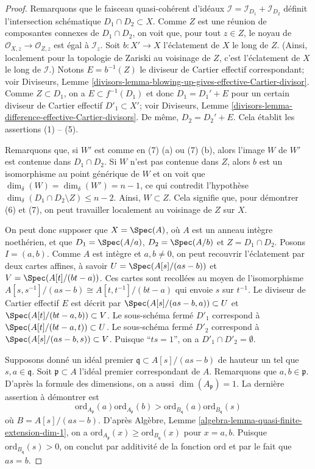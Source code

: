 \begin{proof}
Remarquons que le faisceau quasi-cohérent d'idéaux
$\mathcal{I} = \mathcal{I}_{D_1} + \mathcal{I}_{D_2}$
définit l'intersection schématique $D_1 \cap D_2 \subset X$.
Comme $Z$ est une réunion de composantes connexes de $D_1 \cap D_2$,
on voit que, pour tout $z \in Z$, le noyau de
$\mathcal{O}_{X, z} \to \mathcal{O}_{Z, z}$ est égal à $\mathcal{I}_z$.
Soit $b : X' \to X$ l'éclatement de $X$ le long de $Z$. (Ainsi, localement pour la topologie de Zariski
au voisinage de $Z$, c'est l'éclatement de $X$ le long de $\mathcal{I}$.)
Notons $E = b^{-1}(Z)$ le diviseur de Cartier effectif correspondant; voir
Diviseurs,
Lemme \ref{divisors-lemma-blowing-up-gives-effective-Cartier-divisor}.
Comme $Z \subset D_1$, on a $E \subset f^{-1}(D_1)$ et donc
$D_1 = D_1' + E$ pour un certain diviseur de Cartier effectif $D'_1 \subset X'$;
voir Diviseurs, Lemme \ref{divisors-lemma-difference-effective-Cartier-divisors}.
De même, $D_2 = D_2' + E$. Cela établit les assertions (1) -- (5).

\medskip\noindent
Remarquons que, si $W'$ est comme en (7) (a) ou (7) (b), alors l'image $W$
de $W'$ est contenue dans $D_1 \cap D_2$. Si $W$ n'est pas contenue dans
$Z$, alors $b$ est un isomorphisme au point générique de $W$ et
on voit que $\dim_\delta(W) = \dim_\delta(W') = n - 1$, ce qui
contredit l'hypothèse
$\dim_\delta(D_1 \cap D_2 \setminus Z) \leq n - 2$.
Ainsi, $W \subset Z$. Cela signifie que,
pour démontrer (6) et (7), on peut travailler localement au voisinage de $Z$ sur $X$.

\medskip\noindent
On peut donc supposer que $X = \Spec(A)$, où
$A$ est un anneau intègre noethérien, et que $D_1 = \Spec(A/a)$,
$D_2 = \Spec(A/b)$ et $Z = D_1 \cap D_2$.
Posons $I = (a, b)$. Comme $A$ est intègre et $a, b \not = 0$, on peut
recouvrir l'éclatement par deux cartes affines, à savoir
$U = \Spec(A[s]/(as - b))$ et $V = \Spec(A[t]/(bt -a))$.
Ces cartes sont recollées au moyen de l'isomorphisme
$A[s, s^{-1}]/(as - b) \cong A[t, t^{-1}]/(bt - a)$
qui envoie $s$ sur $t^{-1}$.
Le diviseur de Cartier effectif $E$ est décrit par
$\Spec(A[s]/(as - b, a)) \subset U$ et
$\Spec(A[t]/(bt - a, b)) \subset V$.
Le sous-schéma fermé $D'_1$ correspond à
$\Spec(A[t]/(bt - a, t)) \subset U$.
Le sous-schéma fermé $D'_2$ correspond à
$\Spec(A[s]/(as -b, s)) \subset V$.
Puisque ``$ts = 1$'', on a $D'_1 \cap D'_2 = \emptyset$.

\medskip\noindent
Supposons donné un idéal premier $\mathfrak q \subset A[s]/(as - b)$
de hauteur un tel que $s, a \in \mathfrak q$.
Soit $\mathfrak p \subset A$ l'idéal premier correspondant de $A$.
Remarquons que $a, b \in \mathfrak p$.
D'après la formule des dimensions, on a aussi $\dim(A_{\mathfrak p}) = 1$.
La dernière assertion à démontrer est
$$
\text{ord}_{A_{\mathfrak p}}(a)
\text{ord}_{A_{\mathfrak p}}(b)
>
\text{ord}_{B_{\mathfrak q}}(a)
\text{ord}_{B_{\mathfrak q}}(s)
$$
où $B = A[s]/(as - b)$. D'après
Algèbre, Lemme \ref{algebra-lemma-quasi-finite-extension-dim-1},
on a $\text{ord}_{A_{\mathfrak p}}(x) \geq \text{ord}_{B_{\mathfrak q}}(x)$
pour $x = a, b$. Puisque $\text{ord}_{B_{\mathfrak q}}(s) > 0$, on conclut
par additivité de la fonction $\text{ord}$ et par le fait que
$as = b$.
\end{proof}

